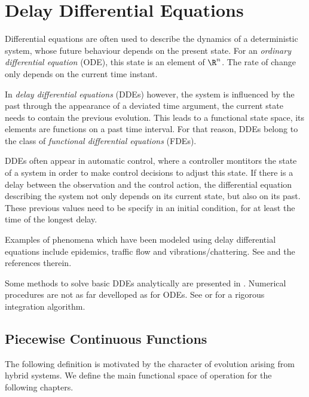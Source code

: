\chapter{Delay Differential Equations}

Differential equations are often used to describe the dynamics of a deterministic system, whose future behaviour depends on the present state.
For an \emph{ordinary differential equation} (ODE), this state is an element of $\R^n$. The rate of change only depends on the current time instant.

In \emph{delay differential equations} (DDEs) however, the system is influenced by the past through the appearance of a deviated time argument, the current state needs to contain the previous evolution.
This leads to a functional state space, its elements are functions on a past time interval.
For that reason, DDEs belong to the class of \emph{functional differential equations} (FDEs).

DDEs often appear in automatic control, where a controller montitors the state of a system in order to make control decisions to adjust this state.
If there is a delay between the observation and the control action, the differential equation describing the system not only depends on its current state, but also on its past.
These previous values need to be specify in an initial condition, for at least the time of the longest delay.


Examples of phenomena which have been modeled using delay differential equations include epidemics, traffic flow and vibrations/chattering. See \cite{Falbo06FDEs} and the references therein.

Some methods to solve basic DDEs analytically are presented in \cite{Falbo06FDEs}. Numerical procedures are not as far develloped as for ODEs. 
See \cite{Bellen13NumericalDDEs} or \cite{Szczlina14RigorousDDEs} for a rigorous integration algorithm.

\section{Piecewise Continuous Functions}
    \label{sec:piecewise-continuous-functions}
    
    The following definition is motivated by the character of evolution arising from hybrid systems. We define the main functional space of operation for the following chapters.


